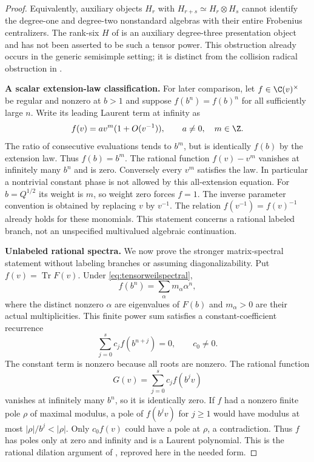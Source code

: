 \begin{proof}
Equivalently, auxiliary objects $H_r$ with
$H_{r+s}\simeq H_r\otimes H_s$ cannot identify the
degree-one and degree-two nonstandard algebras with
their entire Frobenius centralizers.
The rank-six $H$ of  is an auxiliary degree-three
presentation object and has not been asserted to be
such a tensor power.
This obstruction already occurs in the generic
semisimple setting; it is distinct from the collision
radical obstruction in .

\par\smallskip\noindent\textbf{A scalar extension-law classification.}\quad
For later comparison, let $f\in\C(v)^\times$ be regular
and nonzero at $b>1$ and suppose
$f(b^n)=f(b)^n$ for all sufficiently large $n$.
Write its leading Laurent term at infinity as
\[
 f(v)=a v^m(1+O(v^{-1})),\qquad a\ne0,\quad m\in\Z.
\]
The ratio of consecutive evaluations tends to $b^m$,
but is identically $f(b)$ by the extension law.
Thus $f(b)=b^m$. The rational function $f(v)-v^m$
vanishes at infinitely many $b^n$ and is zero.
Conversely every $v^m$ satisfies the law.
In particular a nontrivial constant phase is not allowed
by this all-extension equation.
For $b=Q^{1/2}$ its weight is $m$, so weight zero forces
$f=1$. The inverse parameter convention is obtained by
replacing $v$ by $v^{-1}$.
The relation $f(v^{-1})=f(v)^{-1}$ already holds for
these monomials. This statement concerns a rational
labeled branch, not an unspecified multivalued
algebraic continuation.

\par\smallskip\noindent\textbf{Unlabeled rational spectra.}\quad
We now prove the stronger matrix-spectral statement
without labeling branches or assuming diagonalizability.
Put $f(v)=\operatorname{Tr}F(v)$.
Under \eqref{eq:tensorweilspectral},
\[
 f(b^n)=\sum_\alpha m_\alpha\alpha^n,
\]
where the distinct nonzero $\alpha$ are eigenvalues of
$F(b)$ and $m_\alpha>0$ are their actual multiplicities.
This finite power sum satisfies a constant-coefficient
recurrence
\[
 \sum_{j=0}^s c_j f(b^{n+j})=0,\qquad c_0\ne0.
\]
The constant term is nonzero because all roots are nonzero.
The rational function
\[
 G(v)=\sum_{j=0}^s c_j f(b^jv)
\]
vanishes at infinitely many $b^n$, so it is identically
zero. If $f$ had a nonzero finite pole $\rho$ of maximal
modulus, a pole of $f(b^jv)$ for $j\ge1$ would have modulus
at most $|\rho|/b^j<|\rho|$.
Only $c_0f(v)$ could have a pole at $\rho$, a contradiction.
Thus $f$ has poles only at zero and infinity and is a
Laurent polynomial. This is the rational dilation
argument of , reproved here in the needed form.


\end{proof}
